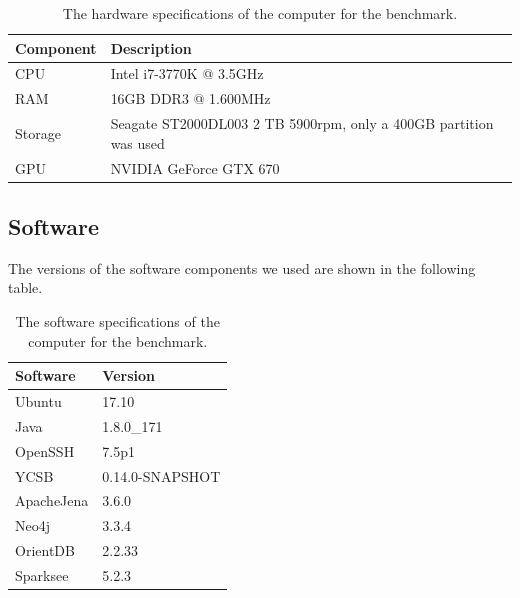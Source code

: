 \begin{table}[!h]
  \begin{minipage}{\textwidth}
    \begin{tabularx}{\textwidth}{ | l | X | }
      \hline
      Component & Description \\ \hline \hline
      CPU & Intel i7-3770K @ 3.5GHz \\ \hline
      RAM & 16GB DDR3 @ 1.600MHz \\ \hline
      Storage & Seagate ST2000DL003 2 TB 5900rpm, only a 400GB partition was used \\ \hline
      GPU & NVIDIA GeForce GTX 670 \\ \hline
    \end{tabularx}
  \end{minipage}
  \caption{The hardware specifications of the computer for the benchmark.}
  \label{tab:hardware}
\end{table}

\subsection{Software}
The versions of the software components we used are shown in the following table.

\begin{table}[!h]
  \begin{minipage}{\textwidth}
    \begin{tabularx}{\textwidth}{ | X | X | }
      \hline
      Software & Version \\ \hline \hline
      Ubuntu & 17.10 \\ \hline
      Java & 1.8.0\_171 \\ \hline
      OpenSSH & 7.5p1 \\ \hline
      YCSB & 0.14.0-SNAPSHOT \\ \hline
      ApacheJena & 3.6.0 \\ \hline
      Neo4j & 3.3.4 \\ \hline
      OrientDB & 2.2.33 \\ \hline
      Sparksee & 5.2.3 \\ \hline
    \end{tabularx}
  \end{minipage}
  \caption{The software specifications of the computer for the benchmark.}
  \label{tab:software}
\end{table}

